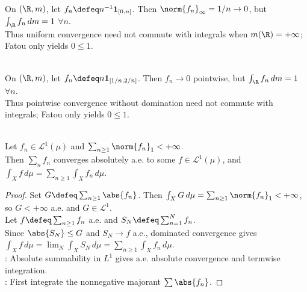 \begin{example} \label{ex:uniform-convergence-needs-finite-measure} \\
On $(\R,m)$, let $f_n\defeq n^{-1}\mathbf{1}_{[0,n]}$. Then $\norm{f_n}_\infty=1/n\to0$, but $\int_\R f_n\,dm=1$ $\forall n$.\\
Thus uniform convergence need not commute with integrals when $m(\R)=+\infty$; Fatou only yields $0\leq1$.
\end{example}

\begin{example} \label{ex:dominated-convergence-needs-domination} \\
On $(\R,m)$, let $f_n\defeq n\mathbf{1}_{[1/n,2/n]}$. Then $f_n\to0$ pointwise, but $\int_\R f_n\,dm=1$ $\forall n$.\\
Thus pointwise convergence without domination need not commute with integrals; Fatou only yields $0\leq1$.
\end{example}

\begin{theorem} \label{thm:l1-absolutely-summable-series-integrate-termwise} \\
Let $f_n\in\mathscr{L}^1(\mu)$ and $\sum_{n\geq1}\norm{f_n}_1<+\infty$.\\
Then $\sum_nf_n$ converges absolutely a.e. to some $f\in\mathscr{L}^1(\mu)$, and $\int_X f\,d\mu=\sum_{n\geq1}\int_X f_n\,d\mu$.
\begin{proof}
Set $G\defeq\sum_{n\geq1}\abs{f_n}$. Then $\int_XG\,d\mu=\sum_{n\geq1}\norm{f_n}_1<+\infty$, so $G<+\infty$ a.e. and $G\in\mathscr{L}^1$.\\
Let $f\defeq\sum_{n\geq1}f_n$ a.e. and $S_N\defeq\sum_{n=1}^{N}f_n$.\\
Since $\abs{S_N}\leq G$ and $S_N\to f$ a.e., dominated convergence gives $\int_Xf\,d\mu=\lim_N\int_XS_N\,d\mu=\sum_{n\geq1}\int_Xf_n\,d\mu$.\\
: Absolute summability in $L^1$ gives a.e. absolute convergence and termwise integration.\\
: First integrate the nonnegative majorant $\sum\abs{f_n}$.
\end{proof}
\end{theorem}


